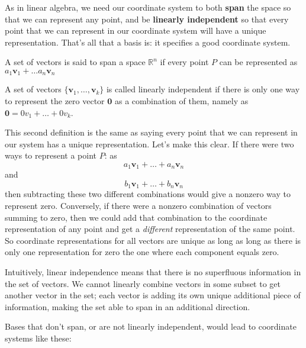	As in linear algebra, we need our coordinate system to both \textbf{span} the space so that we can represent any point, and be \textbf{linearly independent} so that every point that we can represent in our coordinate system will have a unique representation. That's all that a basis is: it specifies a good coordinate system. 
	
	\begin{defn}
		A set of vectors is said to span a space $\mathbb{R}^n$ if every point $P$ can be represented as $a_1 \mathbf v_1 + \dots a_n \mathbf v_n$
	\end{defn}
	
	\begin{defn}
		A set of vectors $\{\mathbf v_1, \dots , \mathbf v_k \}$ is called linearly independent if there is only one way to represent the zero vector $\mathbf 0$ as a combination of them, namely as $\mathbf 0 = 0v_1 + \dots + 0 v_k$.
	\end{defn}
	
	This second definition is the same as saying every point that we can represent in our system has a unique representation. Let's make this clear. If there were two ways to represent a point $P$: as \begin{equation*}
		a_1 \mathbf v_1 + \dots + a_n \mathbf v_n
	\end{equation*} 
	and 
	\begin{equation*}
		b_1 \mathbf v_1 + \dots + b_n \mathbf v_n
	\end{equation*} 
	then subtracting these two different combinations would give a nonzero way to represent zero.  Conversely, if there were a nonzero combination of vectors summing to zero, then we could add that combination to the coordinate representation of any point and get a \emph{different} representation of the same point. So coordinate representations for all vectors are unique as long as long as there is only one representation for zero the one where each component equals zero.
	
	Intuitively, linear independence means that there is no superfluous information in the set of vectors.  We cannot linearly combine vectors in some subset to get another vector in the set; each vector is adding its own unique additional piece of information, making the set able to span in an additional direction.
	
	Bases that don't span, or are not linearly independent, would lead to coordinate systems like these:
	
